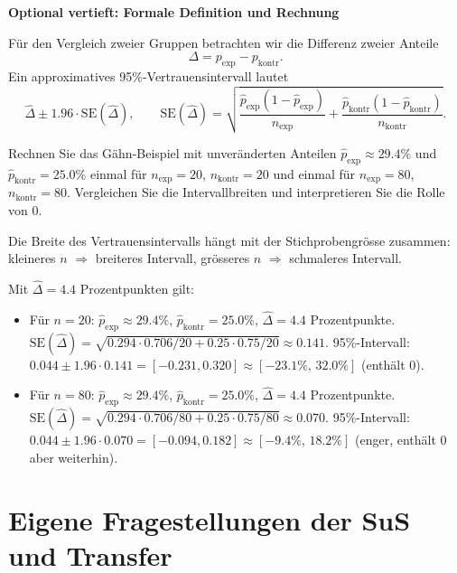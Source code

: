 \begin{mychallenge}
	\textbf{Optional vertieft: Formale Definition und Rechnung}

	Für den Vergleich zweier Gruppen betrachten wir die Differenz zweier Anteile
	\[
		\Delta = p_{\mathrm{exp}} - p_{\mathrm{kontr}}.
	\]
	Ein approximatives 95\%-Vertrauensintervall lautet
	\[
		\hat{\Delta} \pm 1.96 \cdot \mathrm{SE}(\hat{\Delta}),
		\qquad
		\mathrm{SE}(\hat{\Delta}) = \sqrt{\frac{\hat{p}_{\mathrm{exp}}(1-\hat{p}_{\mathrm{exp}})}{n_{\mathrm{exp}}} + \frac{\hat{p}_{\mathrm{kontr}}(1-\hat{p}_{\mathrm{kontr}})}{n_{\mathrm{kontr}}}}.
	\]

	Rechnen Sie das Gähn-Beispiel mit unveränderten Anteilen $\hat{p}_{\mathrm{exp}}\approx29.4\%$ und $\hat{p}_{\mathrm{kontr}}=25.0\%$ einmal für $n_{\mathrm{exp}}=20$, $n_{\mathrm{kontr}}=20$ und einmal für $n_{\mathrm{exp}}=80$, $n_{\mathrm{kontr}}=80$.
	Vergleichen Sie die Intervallbreiten und interpretieren Sie die Rolle von 0.
	\begin{myanswer}
		Die Breite des Vertrauensintervalls hängt mit der Stichprobengrösse zusammen: kleineres $n$ $\Rightarrow$ breiteres Intervall,
		grösseres $n$ $\Rightarrow$ schmaleres Intervall.

		Mit $\hat{\Delta}=4.4$ Prozentpunkten gilt:
		\begin{itemize}
			\item Für $n=20$: $\hat{p}_{\mathrm{exp}}\approx29.4\%$, $\hat{p}_{\mathrm{kontr}}=25.0\%$, $\hat{\Delta}=4.4$ Prozentpunkte.
			      $\mathrm{SE}(\hat{\Delta})=\sqrt{0.294\cdot0.706/20+0.25\cdot0.75/20}\approx0.141$.
			      95\%-Intervall: $0.044 \pm 1.96 \cdot 0.141 = [ -0.231, 0.320 ]\approx[-23.1\%,\,32.0\%]$ (enthält 0).

			\item Für $n=80$: $\hat{p}_{\mathrm{exp}}\approx29.4\%$, $\hat{p}_{\mathrm{kontr}}=25.0\%$, $\hat{\Delta}=4.4$ Prozentpunkte.
			      $\mathrm{SE}(\hat{\Delta})=\sqrt{0.294\cdot0.706/80+0.25\cdot0.75/80}\approx0.070$.
			      95\%-Intervall: $0.044 \pm 1.96 \cdot 0.070 = [ -0.094, 0.182 ]\approx[-9.4\%,\,18.2\%]$ (enger, enthält 0 aber weiterhin).
		\end{itemize}
	\end{myanswer}
\end{mychallenge}

\section{Eigene Fragestellungen der SuS und Transfer}

